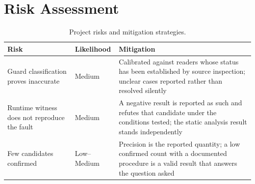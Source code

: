 \documentclass[12pt, a4paper, oneside]{book}
\begin{document}
\section{Risk Assessment}

\begin{table}[H]
\centering
\caption{Project risks and mitigation strategies.}
\renewcommand{\arraystretch}{1.6}
\begin{tabularx}{\textwidth}{L{3.8cm} C{1.8cm} L{6.9cm}}
\toprule
\textbf{Risk} & \textbf{Likelihood} & \textbf{Mitigation} \\
\midrule
Guard classification proves inaccurate & Medium &
  Calibrated against readers whose status has been established by source
  inspection; unclear cases reported rather than resolved silently \\
Runtime witness does not reproduce the fault & Medium &
  A negative result is reported as such and refutes that candidate under the
  conditions tested; the static analysis result stands independently \\
Few candidates confirmed & Low--Medium &
  Precision is the reported quantity; a low confirmed count with a documented
  procedure is a valid result that answers the question asked \\
\bottomrule
\end{tabularx}
\end{table}

\backmatter
\newpage
\renewcommand{\bibname}{References}

\end{document}
